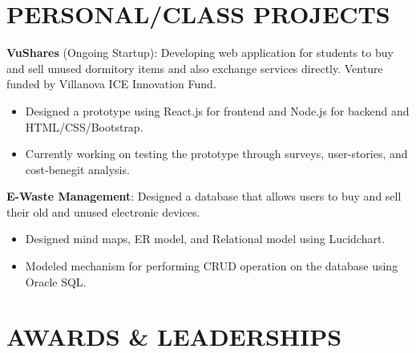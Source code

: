\documentclass[letterpaper,11pt]{article}
\newcommand{\resumeItem}[2]{
  \item\small{
    \textbf{#1}{: #2 \vspace{-2pt}}
  }
}
\newcommand{\resumeSubItem}[2]{\resumeItem{#1}{#2}\vspace{-4pt}}
\begin{document}
\section{\textbf{PERSONAL/CLASS PROJECTS}}
        {\textbf{VuShares} (Ongoing Startup): Developing web application for students to buy and sell unused dormitory items and also exchange services directly. Venture funded by Villanova ICE Innovation Fund. 
        \begin{itemize}
            \itemsep0em 
            \item Designed a prototype using React.js for frontend and Node.js for backend and HTML/CSS/Bootstrap.
            \item Currently working on testing the prototype through surveys, user-stories, and cost-benegit analysis.   
        \end{itemize}
        {\textbf{E-Waste Management}: Designed a database that allows users to buy and sell their old and unused electronic devices.}
        \begin{itemize}
            \itemsep0em 
            \item Designed mind maps, ER model, and Relational model using Lucidchart.
            \item Modeled mechanism for performing CRUD operation on the database using Oracle SQL. 
        \end{itemize}

%
 
\section{\textbf{AWARDS \& LEADERSHIPS}}

}
\end{document}
